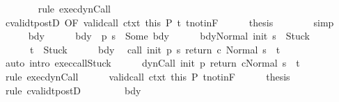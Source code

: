 \begin{isabellebody}
\ \ \ \ \ \ \isamarkupfalse%
\ {\isacharparenleft}rule\ exec{\isacharunderscore}dynCall{\isacharparenright}\isanewline
\ \ \ \ \isamarkupfalse%
\ cvalidt{\isacharunderscore}postD\ {\isacharbrackleft}OF\ valid{\isacharunderscore}call\ ctxt\ this\ P{\isacharbrackright}\ t\ t{\isacharunderscore}notin{\isacharunderscore}F\isanewline
\ \ \ \ \isamarkupfalse%
\ {\isacharquery}thesis\isanewline
\ \ \ \ \ \ \isamarkupfalse%
\ simp\isanewline
\ \ \isamarkupfalse%
\isanewline
\ \ \ \ \isamarkupfalse%
\ bdy\isanewline
\ \ \ \ \isamarkupfalse%
\ bdy{\isacharcolon}\ {\isachardoublequoteopen}{\isasymGamma}\ {\isacharparenleft}p\ s{\isacharparenright}\ {\isacharequal}\ Some\ bdy{\isachardoublequoteclose}\isanewline
\ \ \ \ \isamarkupfalse%
\ {\isachardoublequoteopen}{\isasymGamma}{\isasymturnstile}{\isasymlangle}bdy{\isacharcomma}Normal\ {\isacharparenleft}init\ s{\isacharparenright}{\isasymrangle}\ {\isasymRightarrow}\ Stuck{\isachardoublequoteclose}\ \ \isanewline
\ \ \ \ \ \ {\isachardoublequoteopen}t\ {\isacharequal}\ Stuck{\isachardoublequoteclose}\isanewline
\ \ \ \ \isamarkupfalse%
\ bdy\ \isamarkupfalse%
\ {\isachardoublequoteopen}{\isasymGamma}{\isasymturnstile}{\isasymlangle}call\ init\ {\isacharparenleft}p\ s{\isacharparenright}\ return{\isacharprime}\ c\ {\isacharcomma}Normal\ s{\isasymrangle}\ {\isasymRightarrow}\ t{\isachardoublequoteclose}\isanewline
\ \ \ \ \ \ \isamarkupfalse%
\ {\isacharparenleft}auto\ intro{\isacharcolon}\ exec{\isacharunderscore}callStuck{\isacharparenright}\isanewline
\ \ \ \ \isamarkupfalse%
\ {\isachardoublequoteopen}{\isasymGamma}{\isasymturnstile}{\isasymlangle}dynCall\ init\ p\ return{\isacharprime}\ c{\isacharcomma}Normal\ s{\isasymrangle}\ {\isasymRightarrow}\ t{\isachardoublequoteclose}\ \isanewline
\ \ \ \ \ \ \isamarkupfalse%
\ {\isacharparenleft}rule\ exec{\isacharunderscore}dynCall{\isacharparenright}\isanewline
\ \ \ \ \isamarkupfalse%
\ valid{\isacharunderscore}call\ ctxt\ this\ P\ t{\isacharunderscore}notin{\isacharunderscore}F\isanewline
\ \ \ \ \isamarkupfalse%
\ {\isacharquery}thesis\isanewline
\ \ \ \ \ \ \isamarkupfalse%
\ {\isacharparenleft}rule\ cvalidt{\isacharunderscore}postD{\isacharparenright}\isanewline
\ \ \isamarkupfalse%
\isanewline
\ \ \ \ \isamarkupfalse%
\ bdy\isanewline
\ \ \ \ \isamarkupfalse%

\end{isabellebody}

